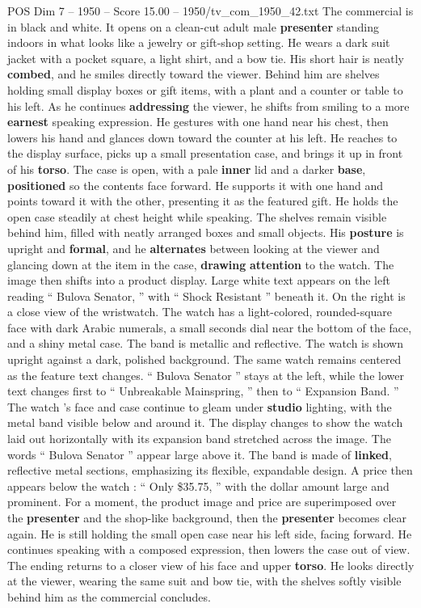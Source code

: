 \begin{textsample}{POS Dim 7 – 1950 – Score 15.00 – 1950/tv\_com\_1950\_42.txt}  \label{ex:f7_pos_014}
The commercial is in black and white.
It opens on a clean-cut adult male \textbf{presenter} standing indoors in what looks like a jewelry or gift-shop setting.
He wears a dark suit jacket with a pocket square, a light shirt, and a bow tie.
His short hair is neatly \textbf{combed}, and he smiles directly toward the viewer.
Behind him are shelves holding small display boxes or gift items, with a plant and a counter or table to his left.
As he continues \textbf{addressing} the viewer, he shifts from smiling to a more \textbf{earnest} speaking expression.
He gestures with one hand near his chest, then lowers his hand and glances down toward the counter at his left.
He reaches to the display surface, picks up a small presentation case, and brings it up in front of his \textbf{torso}.
The case is open, with a pale \textbf{inner} lid and a darker \textbf{base}, \textbf{positioned} so the contents face forward.
He supports it with one hand and points toward it with the other, presenting it as the featured gift.
He holds the open case steadily at chest height while speaking.
The shelves remain visible behind him, filled with neatly arranged boxes and small objects.
His \textbf{posture} is upright and \textbf{formal}, and he \textbf{alternates} between looking at the viewer and glancing down at the item in the case, \textbf{drawing} \textbf{attention} to the watch.
The image then shifts into a product display.
Large white text appears on the left reading “ Bulova Senator, ” with “ Shock Resistant ” beneath it.
On the right is a close view of the wristwatch.
The watch has a light-colored, rounded-square face with dark Arabic numerals, a small seconds dial near the bottom of the face, and a shiny metal case.
The band is metallic and reflective.
The watch is shown upright against a dark, polished background.
The same watch remains centered as the feature text changes. “ Bulova Senator ” stays at the left, while the lower text changes first to “ Unbreakable Mainspring, ” then to “ Expansion Band. ” The watch ’s face and case continue to gleam under \textbf{studio} lighting, with the metal band visible below and around it.
The display changes to show the watch laid out horizontally with its expansion band stretched across the image.
The words “ Bulova Senator ” appear large above it.
The band is made of \textbf{linked}, reflective metal sections, emphasizing its flexible, expandable design.
A price then appears below the watch : “ Only \$35.75, ” with the dollar amount large and prominent.
For a moment, the product image and price are superimposed over the \textbf{presenter} and the shop-like background, then the \textbf{presenter} becomes clear again.
He is still holding the small open case near his left side, facing forward.
He continues speaking with a composed expression, then lowers the case out of view.
The ending returns to a closer view of his face and upper \textbf{torso}.
He looks directly at the viewer, wearing the same suit and bow tie, with the shelves softly visible behind him as the commercial concludes.

\end{textsample}
